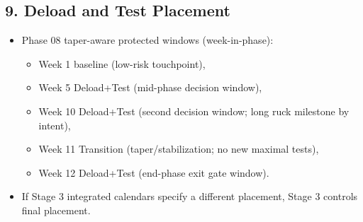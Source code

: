 \documentclass[10pt]{article}
\begin{document}
\begin{landscape}
\subsection*{9. Deload and Test Placement}


\begin{itemize}
\item Phase 08 taper-aware protected windows (week-in-phase):
  \begin{itemize}
  \item Week 1 baseline (low-risk touchpoint),
  \item Week 5 Deload+Test (mid-phase decision window),
  \item Week 10 Deload+Test (second decision window; long ruck milestone by intent),
  \item Week 11 Transition (taper/stabilization; no new maximal tests),
  \item Week 12 Deload+Test (end-phase exit gate window).
  \end{itemize}
\item If Stage 3 integrated calendars specify a different placement, Stage 3 controls final placement.
\end{itemize}

\end{landscape}
\end{document}
